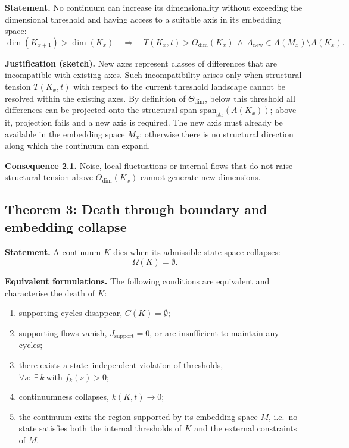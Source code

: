\textbf{Statement.}
No continuum can increase its dimensionality without exceeding the dimensional threshold and having access to a suitable axis in its embedding space:
\[
    \dim(K_{x+1}) > \dim(K_x)
    \quad\Rightarrow\quad
    T(K_x,t) > \Theta_{\mathrm{dim}}(K_x)
    \ \wedge\
    A_{\mathrm{new}} \in A(M_x)\setminus A(K_x).
\]

\textbf{Justification (sketch).}
New axes represent classes of differences that are incompatible with existing axes.
Such incompatibility arises only when structural tension \(T(K_x,t)\) with respect to the current threshold landscape cannot be resolved within the existing axes.
By definition of \(\Theta_{\mathrm{dim}}\), below this threshold all
differences can be projected onto the structural span
\(\mathrm{span}_{\mathrm{str}}(A(K_x))\); above it, projection fails and a new
axis is required.
The new axis must already be available in the embedding space \(M_x\); otherwise there is no structural direction along which the continuum can expand.

\textbf{Consequence 2.1.}
Noise, local fluctuations or internal flows that do not raise structural tension above \(\Theta_{\mathrm{dim}}(K_x)\) cannot generate new dimensions.

\subsection{Theorem 3: Death through boundary and embedding collapse}

\textbf{Statement.}
A continuum \(K\) dies when its admissible state space collapses:
\[
    \Omega(K) = \emptyset.
\]

\textbf{Equivalent formulations.}
The following conditions are equivalent and characterise the death of \(K\):
\begin{enumerate}
    \item supporting cycles disappear, \(C(K) = \emptyset\);
    \item supporting flows vanish, \(J_{\mathrm{support}} = 0\), or are insufficient to maintain any cycles;
    \item there exists a state–independent violation of thresholds, \(\forall s:\ \exists\,k\ \text{with } f_k(s) > 0\);
    \item continuumness collapses, \(k(K,t) \to 0\);
    \item the continuum exits the region supported by its embedding space \(M\), i.e.\ no state satisfies both the internal thresholds of \(K\) and the external constraints of \(M\).
\end{enumerate}

